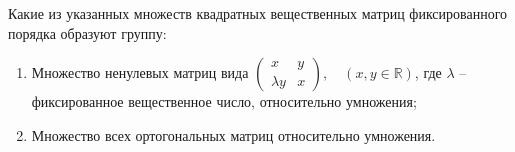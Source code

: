\begin{problem}
    Какие из указанных множеств квадратных вещественных матриц фиксированного порядка образуют группу:
    \begin{enumerate}[label=\alph*)]
        \item Множество ненулевых матриц вида \(\begin{pmatrix}
            x & y \\
            \lambda y & x
        \end{pmatrix}, \quad (x, y \in \mathbb{R})\), где \(\lambda\) -- фиксированное вещественное число, относительно умножения;

        \item Множество всех ортогональных матриц относительно умножения.

    \end{enumerate}

\end{problem}
